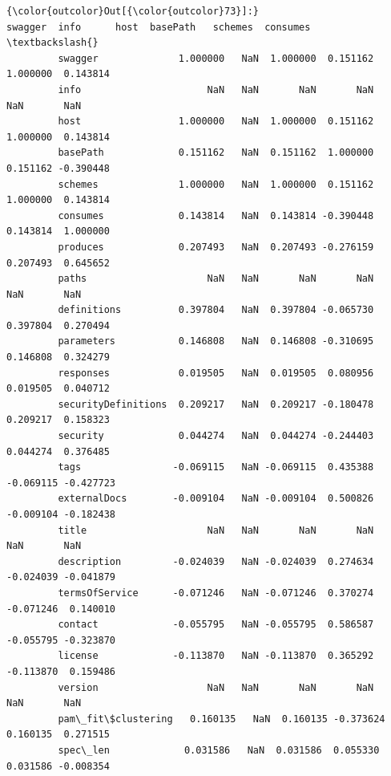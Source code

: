 \documentclass[11pt]{article}
\begin{document}
\begin{Verbatim}[commandchars=\\\{\}]
{\color{outcolor}Out[{\color{outcolor}73}]:}                       swagger  info      host  basePath   schemes  consumes  \textbackslash{}
         swagger              1.000000   NaN  1.000000  0.151162  1.000000  0.143814   
         info                      NaN   NaN       NaN       NaN       NaN       NaN   
         host                 1.000000   NaN  1.000000  0.151162  1.000000  0.143814   
         basePath             0.151162   NaN  0.151162  1.000000  0.151162 -0.390448   
         schemes              1.000000   NaN  1.000000  0.151162  1.000000  0.143814   
         consumes             0.143814   NaN  0.143814 -0.390448  0.143814  1.000000   
         produces             0.207493   NaN  0.207493 -0.276159  0.207493  0.645652   
         paths                     NaN   NaN       NaN       NaN       NaN       NaN   
         definitions          0.397804   NaN  0.397804 -0.065730  0.397804  0.270494   
         parameters           0.146808   NaN  0.146808 -0.310695  0.146808  0.324279   
         responses            0.019505   NaN  0.019505  0.080956  0.019505  0.040712   
         securityDefinitions  0.209217   NaN  0.209217 -0.180478  0.209217  0.158323   
         security             0.044274   NaN  0.044274 -0.244403  0.044274  0.376485   
         tags                -0.069115   NaN -0.069115  0.435388 -0.069115 -0.427723   
         externalDocs        -0.009104   NaN -0.009104  0.500826 -0.009104 -0.182438   
         title                     NaN   NaN       NaN       NaN       NaN       NaN   
         description         -0.024039   NaN -0.024039  0.274634 -0.024039 -0.041879   
         termsOfService      -0.071246   NaN -0.071246  0.370274 -0.071246  0.140010   
         contact             -0.055795   NaN -0.055795  0.586587 -0.055795 -0.323870   
         license             -0.113870   NaN -0.113870  0.365292 -0.113870  0.159486   
         version                   NaN   NaN       NaN       NaN       NaN       NaN   
         pam\_fit\$clustering   0.160135   NaN  0.160135 -0.373624  0.160135  0.271515   
         spec\_len             0.031586   NaN  0.031586  0.055330  0.031586 -0.008354   
         

\end{Verbatim}
\end{document}

